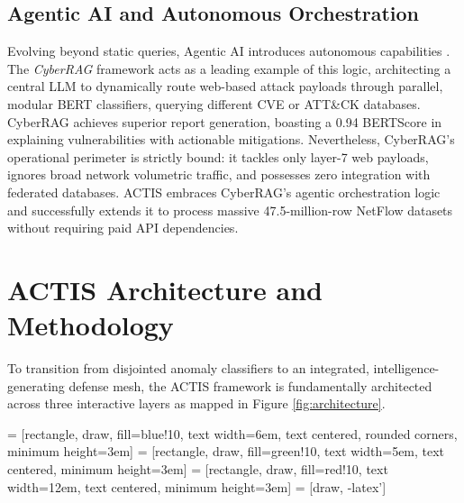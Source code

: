 \documentclass[conference]{IEEEtran}
\begin{document}
\subsection{Agentic AI and Autonomous Orchestration}
Evolving beyond static queries, Agentic AI introduces autonomous capabilities \cite{ref6Kim}. The \textit{CyberRAG} framework \cite{ref3CyberRAG} acts as a leading example of this logic, architecting a central LLM to dynamically route web-based attack payloads through parallel, modular BERT classifiers, querying different CVE or ATT\&CK databases. CyberRAG achieves superior report generation, boasting a 0.94 BERTScore in explaining vulnerabilities with actionable mitigations. Nevertheless, CyberRAG's operational perimeter is strictly bound: it tackles only layer-7 web payloads, ignores broad network volumetric traffic, and possesses zero integration with federated databases. ACTIS embraces CyberRAG’s agentic orchestration logic and successfully extends it to process massive 47.5-million-row NetFlow datasets without requiring paid API dependencies.

\section{ACTIS Architecture and Methodology}
To transition from disjointed anomaly classifiers to an integrated, intelligence-generating defense mesh, the ACTIS framework is fundamentally architected across three interactive layers as mapped in Figure \ref{fig:architecture}.

 = [rectangle, draw, fill=blue!10, text width=6em, text centered, rounded corners, minimum height=3em]
 = [rectangle, draw, fill=green!10, text width=5em, text centered, minimum height=3em]
 = [rectangle, draw, fill=red!10, text width=12em, text centered, minimum height=3em]
 = [draw, -latex']
\end{document}
